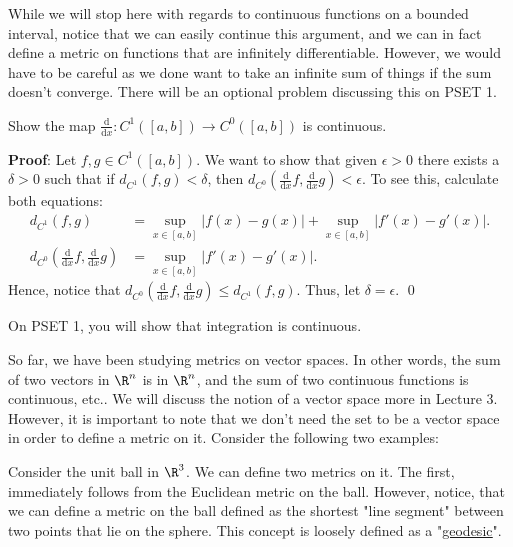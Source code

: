 While we will stop here with regards to continuous functions on a bounded interval, notice that we can easily continue this argument, and we can in fact define a metric on functions that are infinitely differentiable. However, we would have to be careful as we done want to take an infinite sum of things if the sum doesn't converge. There will be an optional problem discussing this on PSET 1.

\begin{example}
Show the map $\frac{\mathrm d}{\mathrm dx}: C^1([a,b]) \to C^0([a,b])$ is continuous.
\end{example}
\textbf{Proof}: Let $f,g \in C^1([a,b])$. We want to show that given $\epsilon >0$ there exists a $\delta >0$ such that if $d_{C^1}(f,g) < \delta$, then $d_{C^0}\left(\frac{\mathrm d}{\mathrm dx} f, \frac{\mathrm d}{\mathrm dx}g\right) < \epsilon$. To see this, calculate both equations:
\begin{align*}
    d_{C^1}(f,g) &= \sup_{x\in [a,b]} |f(x) - g(x)| + \sup_{x\in [a,b]} |f'(x) - g'(x)|. \\
    d_{C^0}\left(\frac{\mathrm d}{\mathrm dx} f, \frac{\mathrm d}{\mathrm dx}g\right) &= \sup_{x\in [a,b]} |f'(x) -g'(x)|.
\end{align*}
Hence, notice that $d_{C^0}\left(\frac{\mathrm d}{\mathrm dx} f, \frac{\mathrm d}{\mathrm dx}g\right) \leq d_{C^1}(f,g)$. Thus, let $\delta = \epsilon.$ \qed 

\begin{remark}
On PSET 1, you will show that integration is continuous.
\end{remark}

So far, we have been studying metrics on vector spaces. In other words, the sum of two vectors in $\R^n$ is in $\R^n$, and the sum of two continuous functions is continuous, etc.. We will discuss the notion of a vector space more in Lecture 3. However, it is important to note that we don't need the set to be a vector space in order to define a metric on it. Consider the following two examples:

\begin{example}[Geodesic]
Consider the unit ball in $\R^3$. We can define two metrics on it. The first, immediately follows from the Euclidean metric on the ball. However, notice, that we can define a metric on the ball defined as the shortest "line segment" between two points that lie on the sphere. This concept is loosely defined as a "\underline{\href{https://en.wikipedia.org/wiki/Geodesic}{geodesic}}".
\end{example}

